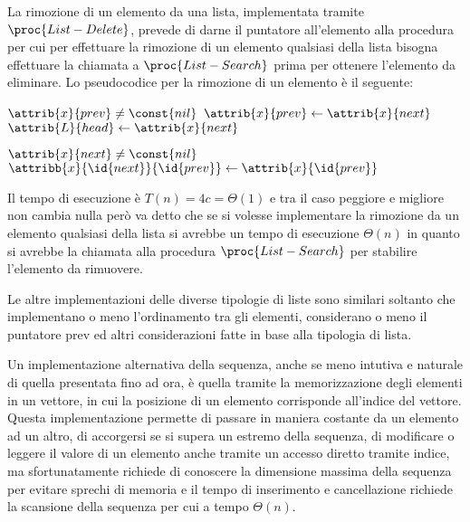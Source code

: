 La rimozione di un elemento da una lista, implementata tramite $\proc{List-Delete}$,
prevede di darne il puntatore all'elemento alla procedura per cui per effettuare
la rimozione di un elemento qualsiasi della lista bisogna effettuare la chiamata
a $\proc{List-Search}$ prima per ottenere l'elemento da eliminare.
Lo pseudocodice per la rimozione di un elemento è il seguente:
\begin{codebox}
\li \If $\attrib{x}{prev} \neq \const{nil}$
    \Then
\li              $\attrib{x}{prev} \gets \attrib{x}{next}$
    \End
\li \Else        $\attrib{L}{head} \gets \attrib{x}{next}$

\li \If $\attrib{x}{next} \neq \const{nil}$
    \Then
\li              $\attribb{x}{\id{next}}{\id{prev}} \gets \attrib{x}{\id{prev}}$
    \End
\end{codebox}
Il tempo di esecuzione è $T(n) = 4c = \Theta(1)$ e tra il caso peggiore e migliore non cambia
nulla però va detto che se si volesse implementare la rimozione da un elemento qualsiasi
della lista si avrebbe un tempo di esecuzione $\Theta(n)$ in quanto si avrebbe la chiamata
alla procedura $\proc{List-Search}$ per stabilire l'elemento da rimuovere.

Le altre implementazioni delle diverse tipologie di liste sono similari soltanto
che implementano o meno l'ordinamento tra gli elementi, considerano o meno il puntatore prev
ed altri considerazioni fatte in base alla tipologia di lista.

Un implementazione alternativa della sequenza, anche se meno intutiva e naturale
di quella presentata fino ad ora, è quella tramite la memorizzazione degli elementi
in un vettore, in cui la posizione di un elemento corrisponde all'indice del vettore.\newline
Questa implementazione permette di passare in maniera costante da un elemento ad un altro,
di accorgersi se si supera un estremo della sequenza, di modificare o leggere il valore
di un elemento anche tramite un accesso diretto tramite indice, ma sfortunatamente
richiede di conoscere la dimensione massima della sequenza per evitare sprechi di memoria
e il tempo di inserimento e cancellazione richiede la scansione della sequenza per cui a tempo $\Theta(n)$.
